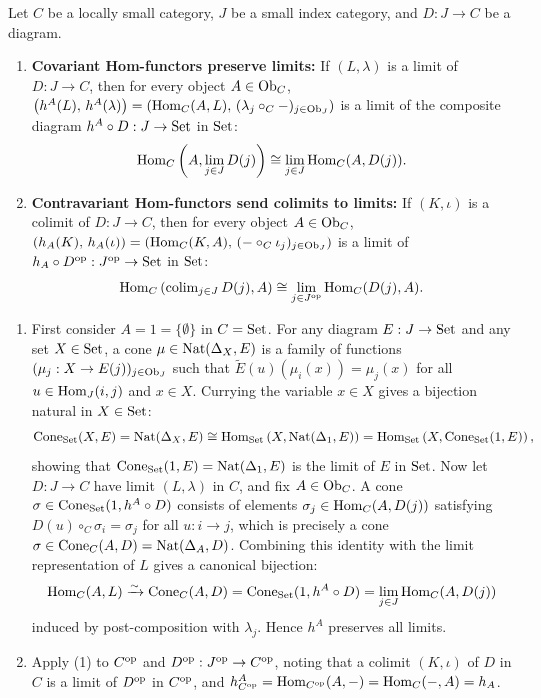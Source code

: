 \documentclass[10pt,a4paper]{article}
\begin{document}
\begin{theorem}\label{thm:hom_continuity}
Let $C$ be a locally small category, $J$ be a small index category, and $D : J \to C$ be a diagram.
\begin{enumerate}
\item \textbf{Covariant Hom-functors preserve limits:} If $(L, \lambda)$ is a limit of $D : J \to C$, then for every object $A \in {\textrm{Ob}}_C$, $\left(h^A(L),\, h^A(\lambda)\right) = \left({\textrm{Hom}}_C(A, L),\, (\lambda_j \circ_C -)_{j \in {\textrm{Ob}}_J}\right)$ is a limit of the composite diagram $h^A \circ D : J \to {\textrm{Set}}$ in ${\textrm{Set}}$:
$${\textrm{Hom}}_C\left(A, \lim_{j \in J} D(j)\right) \cong \lim_{j \in J} {\textrm{Hom}}_C(A, D(j)).$$
\item \textbf{Contravariant Hom-functors send colimits to limits:} If $(K, \iota)$ is a colimit of $D : J \to C$, then for every object $A \in {\textrm{Ob}}_C$, $\left(h_A(K),\, h_A(\iota)\right) = \left({\textrm{Hom}}_C(K, A),\, (- \circ_C \iota_j)_{j \in {\textrm{Ob}}_J}\right)$ is a limit of $h_A \circ D^{\textrm{op}} : J^{\textrm{op}} \to {\textrm{Set}}$ in ${\textrm{Set}}$:
$${\textrm{Hom}}_C\left(\mathrm{colim}_{j \in J}\, D(j), A\right) \cong \lim_{j \in J^{\textrm{op}}} {\textrm{Hom}}_C(D(j), A).$$
\end{enumerate}
\end{theorem}
\myprf
\begin{enumerate}
\item First consider $A = 1 = \{\emptyset\}$ in $C = {\textrm{Set}}$. For any diagram $E : J \to {\textrm{Set}}$ and any set $X \in {\textrm{Set}}$, a cone $\mu \in {\textrm{Nat}}(\Delta_X, E)$ is a family of functions $(\mu_j : X \to E(j))_{j \in {\textrm{Ob}}_J}$ such that $\widetilde{E}(u)(\mu_i(x)) = \mu_j(x)$ for all $u \in {\textrm{Hom}}_J(i, j)$ and $x \in X$. Currying the variable $x \in X$ gives a bijection natural in $X \in {\textrm{Set}}$:
$$\mathrm{Cone}_{{\textrm{Set}}}(X, E) = {\textrm{Nat}}(\Delta_X, E) \cong {\textrm{Hom}}_{\textrm{Set}}\left(X, {\textrm{Nat}}(\Delta_1, E)\right) = {\textrm{Hom}}_{\textrm{Set}}\left(X, \mathrm{Cone}_{{\textrm{Set}}}(1, E)\right),$$
showing that $\mathrm{Cone}_{{\textrm{Set}}}(1, E) = {\textrm{Nat}}(\Delta_1, E)$ is the limit of $E$ in ${\textrm{Set}}$.
Now let $D : J \to C$ have limit $(L, \lambda)$ in $C$, and fix $A \in {\textrm{Ob}}_C$. A cone $\sigma \in \mathrm{Cone}_{{\textrm{Set}}}(1, h^A \circ D)$ consists of elements $\sigma_j \in {\textrm{Hom}}_C(A, D(j))$ satisfying $D(u) \circ_C \sigma_i = \sigma_j$ for all $u : i \to j$, which is precisely a cone $\sigma \in \mathrm{Cone}_C(A, D) = {\textrm{Nat}}(\Delta_A, D)$. Combining this identity with the limit representation of $L$ gives a canonical bijection:
$${\textrm{Hom}}_C(A, L) \xrightarrow{\sim} \mathrm{Cone}_C(A, D) = \mathrm{Cone}_{{\textrm{Set}}}(1, h^A \circ D) = \lim_{j \in J} {\textrm{Hom}}_C(A, D(j))$$
induced by post-composition with $\lambda_j$. Hence $h^A$ preserves all limits.
\item Apply (1) to $C^{\textrm{op}}$ and $D^{\textrm{op}} : J^{\textrm{op}} \to C^{\textrm{op}}$, noting that a colimit $(K, \iota)$ of $D$ in $C$ is a limit of $D^{\textrm{op}}$ in $C^{\textrm{op}}$, and $h^{A}_{C^{\textrm{op}}} = {\textrm{Hom}}_{C^{\textrm{op}}}(A, -) = {\textrm{Hom}}_C(-, A) = h_A$.
\end{enumerate}
\myqed
\end{document}

